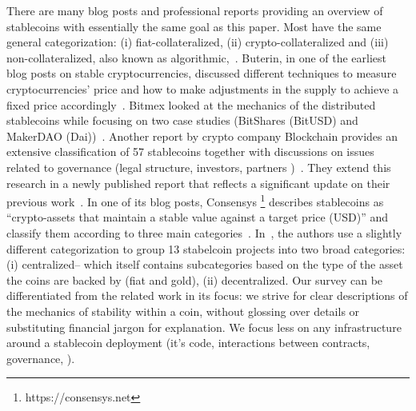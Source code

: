 There are many blog posts and professional reports providing an overview of stablecoins with essentially the same goal as this paper. Most have the same general categorization: (i) fiat-collateralized, (ii) crypto-collateralized and (iii) non-collateralized, also known as algorithmic,\eg~\cite{hackernoon, comprehensiveOverview, linkedin}. Buterin, in one of the earliest blog posts on stable cryptocurrencies, discussed different techniques to measure cryptocurrencies' price and how to make adjustments in the supply to achieve a fixed price accordingly~\cite{TheSearc7:online}. Bitmex looked at the mechanics of the distributed stablecoins while focusing on two case studies (\ie BitShares (BitUSD) and MakerDAO (Dai))~\cite{bitmex}. Another report by crypto company Blockchain provides an extensive classification of 57 stablecoins together with discussions on issues related to governance (\eg legal structure, investors, partners \etc)~\cite{reportone}. They extend this research in a newly published report that reflects a significant update on their previous work~\cite{reporttwo}. In one of its blog posts, Consensys \footnote{https://consensys.net} describes stablecoins as ``crypto-assets that maintain a stable value against a target price (\eg USD)'' and classify them according to three main categories~\cite{StateofS96:online}. In~\cite{cryptoinsider}, the authors use a slightly different categorization to group 13 stabelcoin projects into two broad categories: (i) centralized-- which itself contains subcategories based on the type of the asset the coins are backed by (\eg fiat and gold), (ii) decentralized. Our survey can be differentiated from the related work in its focus: we strive for clear descriptions of the mechanics of stability within a coin, without glossing over details or substituting financial jargon for explanation. We focus less on any infrastructure around a stablecoin deployment (\eg it's code, interactions between contracts, governance, \etc).




